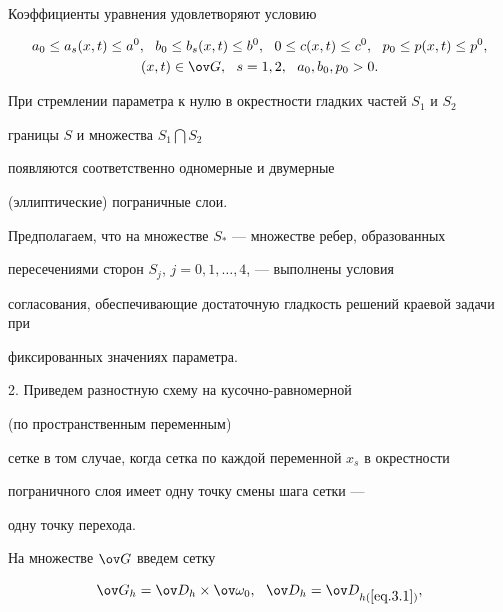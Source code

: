 Коэффициенты уравнения удовлетворяют условию


\begin{gather*}


a_0\le a_s(x,t)\le a^0, \ \ b_0\le b_s(x,t)\le b^0, \ \


0\le c(x,t)\le c^0, \ \ p_0\le p(x,t)\le p^0, \\


%


(x,t)\in \ov G, \ \ s=1,2, \ \ a_0, b_0, p_0> 0.


\end{gather*}





При стремлении параметра к нулю в окрестности гладких частей $S_1$ и $S_2$


границы $S$ и множества $S_1\bigcap S_2$ 


появляются соответственно одномерные и двумерные


(эллиптические) пограничные слои.





Предполагаем, что на множестве $S_*$ --- множестве ребер, образованных 


пересечениями сторон $S_j$, $j=0,1,\dotsc,4$, --- выполнены условия 


согласования, обеспечивающие достаточную гладкость решений краевой задачи при


фиксированных значениях параметра.





2. Приведем разностную схему на кусочно-равномерной


(по пространственным переменным)


сетке в том случае, когда сетка по каждой переменной $x_s$ в окрестности


пограничного слоя имеет одну точку смены шага сетки ---


одну точку перехода.





На множестве $\ov G$ введем сетку


\begin{equation} \label{eq.6.4}


\ov G_h=\ov D_h\times \ov\omega_0, \ \ \ov D_h=\ov D_{h(\ref{eq.3.1})},


\end{equation}


